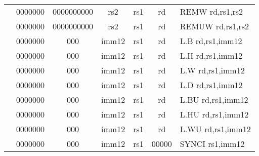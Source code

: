 \begin{table}[p]
\begin{small}
\begin{center}
\begin{tabular}{rcccccccccl}
&
\multicolumn{1}{|c|}{0000000} &
\multicolumn{5}{c|}{0000000000} &
\multicolumn{1}{c|}{rs2} &
\multicolumn{1}{c|}{rs1} &
\multicolumn{1}{c|}{rd} & REMW rd,rs1,rs2 \\
\cline{2-10}
  

&
\multicolumn{1}{|c|}{0000000} &
\multicolumn{5}{c|}{0000000000} &
\multicolumn{1}{c|}{rs2} &
\multicolumn{1}{c|}{rs1} &
\multicolumn{1}{c|}{rd} & REMUW rd,rs1,rs2 \\
\cline{2-10}
  

&
\multicolumn{1}{|c|}{0000000} &
\multicolumn{2}{c|}{000} &
\multicolumn{4}{c|}{imm12} &
\multicolumn{1}{c|}{rs1} &
\multicolumn{1}{c|}{rd} & L.B rd,rs1,imm12 \\
\cline{2-10}
  

&
\multicolumn{1}{|c|}{0000000} &
\multicolumn{2}{c|}{000} &
\multicolumn{4}{c|}{imm12} &
\multicolumn{1}{c|}{rs1} &
\multicolumn{1}{c|}{rd} & L.H rd,rs1,imm12 \\
\cline{2-10}
  

&
\multicolumn{1}{|c|}{0000000} &
\multicolumn{2}{c|}{000} &
\multicolumn{4}{c|}{imm12} &
\multicolumn{1}{c|}{rs1} &
\multicolumn{1}{c|}{rd} & L.W rd,rs1,imm12 \\
\cline{2-10}
  

&
\multicolumn{1}{|c|}{0000000} &
\multicolumn{2}{c|}{000} &
\multicolumn{4}{c|}{imm12} &
\multicolumn{1}{c|}{rs1} &
\multicolumn{1}{c|}{rd} & L.D rd,rs1,imm12 \\
\cline{2-10}
  

&
\multicolumn{1}{|c|}{0000000} &
\multicolumn{2}{c|}{000} &
\multicolumn{4}{c|}{imm12} &
\multicolumn{1}{c|}{rs1} &
\multicolumn{1}{c|}{rd} & L.BU rd,rs1,imm12 \\
\cline{2-10}
  

&
\multicolumn{1}{|c|}{0000000} &
\multicolumn{2}{c|}{000} &
\multicolumn{4}{c|}{imm12} &
\multicolumn{1}{c|}{rs1} &
\multicolumn{1}{c|}{rd} & L.HU rd,rs1,imm12 \\
\cline{2-10}
  

&
\multicolumn{1}{|c|}{0000000} &
\multicolumn{2}{c|}{000} &
\multicolumn{4}{c|}{imm12} &
\multicolumn{1}{c|}{rs1} &
\multicolumn{1}{c|}{rd} & L.WU rd,rs1,imm12 \\
\cline{2-10}
  

&
\multicolumn{1}{|c|}{0000000} &
\multicolumn{2}{c|}{000} &
\multicolumn{4}{c|}{imm12} &
\multicolumn{1}{c|}{rs1} &
\multicolumn{1}{c|}{00000} & SYNCI rs1,imm12 \\
\cline{2-10}
  


\end{tabular}
\end{center}
\end{small}
\end{table}
